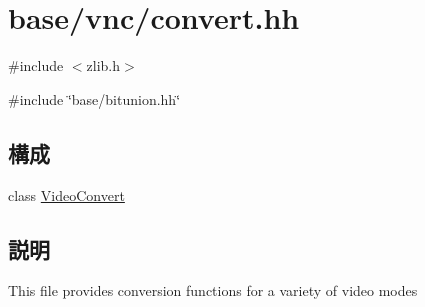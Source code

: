 \hypertarget{convert_8hh}{
\section{base/vnc/convert.hh}
\label{convert_8hh}
}
{\ttfamily \#include $<$zlib.h$>$}\par
{\ttfamily \#include \char`\"{}base/bitunion.hh\char`\"{}}\par
\subsection*{構成}
\begin{DoxyCompactItemize}
\item 
class \hyperlink{classVideoConvert}{VideoConvert}
\end{DoxyCompactItemize}


\subsection{説明}
This file provides conversion functions for a variety of video modes 